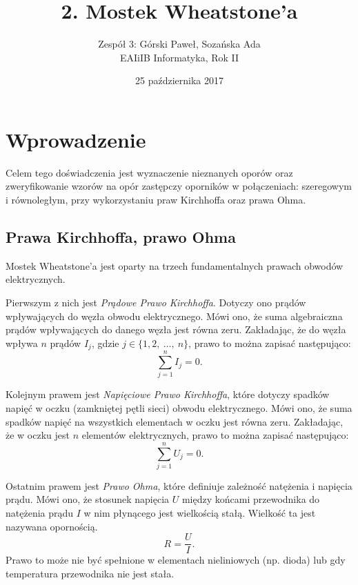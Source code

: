 \documentclass[12pt,a4paper]{article}
\title{2. Mostek Wheatstone'a}
\date{25 października 2017}
\author{
	Zespół 3: Górski Paweł, Sozańska Ada\\
	EAIiIB Informatyka, Rok II
}
\numberwithin{equation}{section}
\begin{document}
\maketitle
\section{Wprowadzenie}
Celem tego doświadczenia jest wyznaczenie nieznanych oporów oraz zweryfikowanie wzorów na opór zastępczy oporników w połączeniach: szeregowym i równoległym, przy wykorzystaniu praw Kirchhoffa oraz prawa Ohma.

\subsection{Prawa Kirchhoffa, prawo Ohma}

Mostek Wheatstone'a jest oparty na trzech fundamentalnych prawach obwodów elektrycznych.

Pierwszym z nich jest \emph{Prądowe Prawo Kirchhoffa}. Dotyczy ono prądów wpływających do węzła obwodu elektrycznego. Mówi ono, że suma algebraiczna prądów wpływających do danego węzła jest równa zeru. Zakładając, że do węzła wpływa $n$ prądów $I_j$, gdzie $j \in \{1,2,~\ldots,~n\}$, prawo to można zapisać następująco:
\begin{equation}
	\sum_{j = 1}^{n} I_j = 0.
	\label{krichoff1}
\end{equation}

\pagebreak
Kolejnym prawem jest \emph{Napięciowe Prawo Kirchhoffa}, które dotyczy spadków napięć w oczku (zamkniętej pętli sieci) obwodu elektrycznego. Mówi ono, że suma spadków napięć na wszystkich elementach w oczku jest równa zeru. Zakładając, że w oczku jest $n$ elementów elektrycznych, prawo to można zapisać następująco:
\begin{equation}
	\sum_{j = 1}^{n} U_j = 0.
	\label{krichoff2}
\end{equation}

Ostatnim prawem jest \emph{Prawo Ohma}, które definiuje zależność natężenia i napięcia prądu. Mówi ono, że stosunek napięcia $U$ między końcami przewodnika do natężenia prądu $I$ w nim płynącego jest wielkością stałą. Wielkość ta jest nazywana opornością. 
\begin{equation}
	R = \frac{U}{I}.
	\label{ohm}
\end{equation}
Prawo to może nie być spełnione w elementach nieliniowych (np. dioda) lub gdy temperatura przewodnika nie jest stała.

\pagebreak
\end{document}

